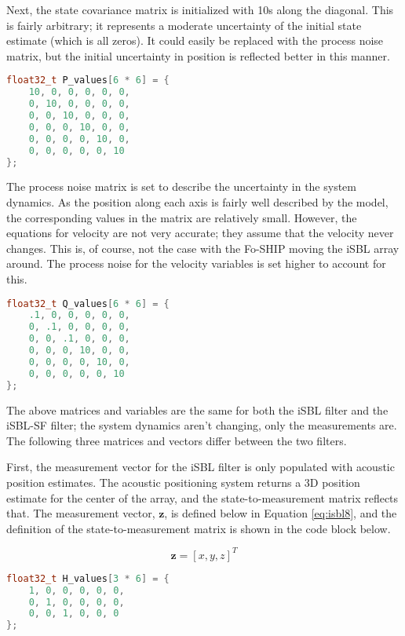 \documentclass[11pt]{ucthesisCP}
\begin{document}
Next, the state covariance matrix is initialized with 10s along the diagonal. This is fairly arbitrary; it represents a moderate uncertainty of the initial state estimate (which is all zeros). It could easily be replaced with the process noise matrix, but the initial uncertainty in position is reflected better in this manner.

\begin{lstlisting}[language=C++]
float32_t P_values[6 * 6] = {
	10, 0, 0, 0, 0, 0,
	0, 10, 0, 0, 0, 0,
	0, 0, 10, 0, 0, 0,
	0, 0, 0, 10, 0, 0,
	0, 0, 0, 0, 10, 0,
	0, 0, 0, 0, 0, 10
};
\end{lstlisting}

The process noise matrix is set to describe the uncertainty in the system dynamics. As the position along each axis is fairly well described by the model, the corresponding values in the matrix are relatively small. However, the equations for velocity are not very accurate; they assume that the velocity never changes. This is, of course, not the case with the Fo-SHIP moving the iSBL array around. The process noise for the velocity variables is set higher to account for this.

\begin{lstlisting}[language=C++]
float32_t Q_values[6 * 6] = {
	.1, 0, 0, 0, 0, 0,
	0, .1, 0, 0, 0, 0,
	0, 0, .1, 0, 0, 0,
	0, 0, 0, 10, 0, 0,
	0, 0, 0, 0, 10, 0,
	0, 0, 0, 0, 0, 10
};
\end{lstlisting}

The above matrices and variables are the same for both the iSBL filter and the iSBL-SF filter; the system dynamics aren’t changing, only the measurements are. The following three matrices and vectors differ between the two filters.

First, the measurement vector for the iSBL filter is only populated with acoustic position estimates. The acoustic positioning system returns a 3D position estimate for the center of the array, and the state-to-measurement matrix reflects that. The measurement vector, \(\mathbf{z}\), is defined below in Equation \ref{eq:isbl8}, and the definition of the state-to-measurement matrix is shown in the code block below.

\begin{equation} \label{eq:isbl8}
	\mathbf{z} = [x, y, z]^T
\end{equation}

\begin{lstlisting}[language=C++]
float32_t H_values[3 * 6] = {
	1, 0, 0, 0, 0, 0,
	0, 1, 0, 0, 0, 0,
	0, 0, 1, 0, 0, 0
};
\end{lstlisting}
\end{document}
